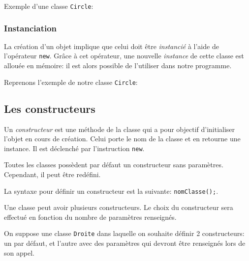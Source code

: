 				\begin{exemple}
					Exemple d'une classe \lstinline|Circle|:
					
				\end{exemple}
			
			\subsubsection{Instanciation}
			
				La création d'un objet implique que celui doit être \emph{instancié} à l'aide de l'opérateur \lstinline|new|.
				Grâce à cet opérateur, une nouvelle \emph{instance} de cette classe est allouée en mémoire: il est alors possible de l'utiliser dans notre programme.
				
				\begin{exemple}
					Reprenons l'exemple de notre classe \lstinline|Circle|:
					
				\end{exemple}
		
		\subsection{Les constructeurs}
		
			\begin{definition}
				Un \emph{constructeur} est une méthode de la classe qui a pour objectif d'initialiser l'objet en cours de création. Celui porte le nom de la classe et en retourne une instance. Il est déclenché par l'instruction \lstinline|new|.	
			\end{definition}
		
			Toutes les classes possèdent par défaut un constructeur sans paramètres. Cependant, il peut être redéfini.
			
			La syntaxe pour définir un constructeur est la suivante: \lstinline|nomClasse();|.
			
			\begin{remarque}
				Une classe peut avoir plusieurs constructeurs. Le choix du constructeur sera effectué en fonction du nombre de paramètres renseignés.
			\end{remarque}
		
			\begin{exemple}
				On suppose une classe \lstinline|Droite| dans laquelle on souhaite définir 2 constructeurs: un par défaut, et l'autre avec des paramètres qui devront être renseignés lors de son appel.
				
			\end{exemple}
			
